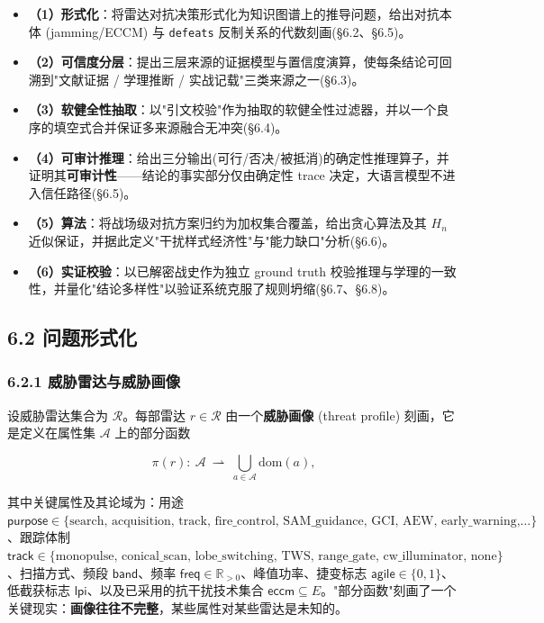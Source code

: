 \documentclass[12pt,a4paper]{ctexart}
\begin{document}
\begin{itemize}[leftmargin=2em]
\item \textbf{（1）形式化}：将雷达对抗决策形式化为知识图谱上的推导问题，给出对抗本体 (jamming/ECCM) 与 \texttt{defeats} 反制关系的代数刻画(§6.2、§6.5)。
\item \textbf{（2）可信度分层}：提出三层来源的证据模型与置信度演算，使每条结论可回溯到"文献证据 / 学理推断 / 实战记载"三类来源之一(§6.3)。
\item \textbf{（3）软健全性抽取}：以"引文校验"作为抽取的软健全性过滤器，并以一个良序的填空式合并保证多来源融合无冲突(§6.4)。
\item \textbf{（4）可审计推理}：给出三分输出(可行/否决/被抵消)的确定性推理算子，并证明其\textbf{可审计性}——结论的事实部分仅由确定性 trace 决定，大语言模型不进入信任路径(§6.5)。
\item \textbf{（5）算法}：将战场级对抗方案归约为加权集合覆盖，给出贪心算法及其 $H_n$ 近似保证，并据此定义"干扰样式经济性"与"能力缺口"分析(§6.6)。
\item \textbf{（6）实证校验}：以已解密战史作为独立 ground truth 校验推理与学理的一致性，并量化"结论多样性"以验证系统克服了规则坍缩(§6.7、§6.8)。
\end{itemize}


\subsection*{6.2 问题形式化}

\subsubsection*{6.2.1 威胁雷达与威胁画像}

设威胁雷达集合为 $\mathcal{R}$。每部雷达 $r\in\mathcal{R}$ 由一个\textbf{威胁画像} (threat profile) 刻画，它是定义在属性集 $\mathcal{A}$ 上的部分函数

\[\pi(r):\ \mathcal{A}\ \rightharpoonup\ \bigcup_{a\in\mathcal{A}}\mathrm{dom}(a),\]

其中关键属性及其论域为：用途 $\mathsf{purpose}\in\{\text{search, acquisition, track, fire\_control, SAM\_guidance, GCI, AEW, early\_warning,}\dots\}$、跟踪体制 $\mathsf{track}\in\{\text{monopulse, conical\_scan, lobe\_switching, TWS, range\_gate, cw\_illuminator, none}\}$、扫描方式、频段 $\mathsf{band}$、频率 $\mathsf{freq}\in\mathbb{R}_{>0}$、峰值功率、捷变标志 $\mathsf{agile}\in\{0,1\}$、低截获标志 $\mathsf{lpi}$、以及已采用的抗干扰技术集合 $\mathsf{eccm}\subseteq E$。"部分函数"刻画了一个关键现实：\textbf{画像往往不完整}，某些属性对某些雷达是未知的。
\end{document}

